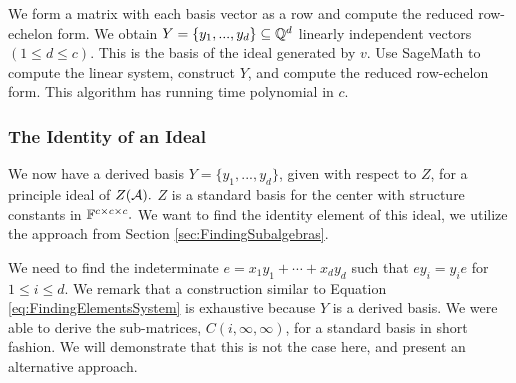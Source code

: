 \documentclass[../thesis.tex]{subfiles}
\begin{document}
We form a matrix with each basis vector as a row and compute the reduced row-echelon form. We obtain $Y=\{y_1,...,y_d\}\subseteq\mathbb{Q}^d$ linearly independent vectors $(1\leq d\leq c)$. This is the basis of the ideal generated by $v.$ Use SageMath to compute the linear system, construct $Y$, and compute the reduced row-echelon form. This algorithm has running time polynomial in $c.$

 \subsubsection{The Identity of an Ideal}
We now have a derived basis $Y = \{y_1,...,y_d\}$, given with respect to $Z$, for a principle ideal of $Z(\mathcal{A}).$ $Z$ is a standard basis for the center with structure constants in $\mathbb{F}^{c\times c\times c}.$ We want to find the identity element of this ideal, we utilize the approach from Section \ref{sec:FindingSubalgebras}.

We need to find the indeterminate $e=x_1y_1+\cdots+x_dy_d$ such that $ey_i = y_ie$ for $1\leq i\leq d.$ We remark that a construction similar to Equation \ref{eq:FindingElementsSystem} is exhaustive because $Y$ is a derived basis. We were able to derive the sub-matrices, $C(i,\infty,\infty)$, for a standard basis in short fashion. We will demonstrate that this is not the case here, and present an alternative approach.
\end{document}
